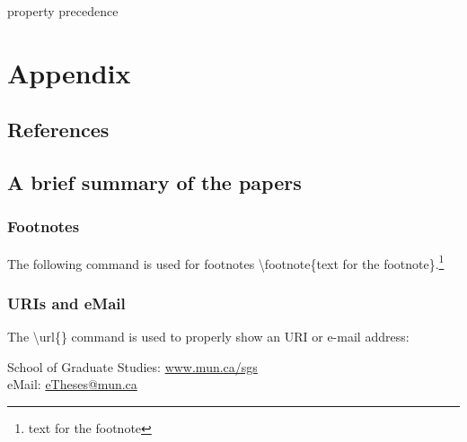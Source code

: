 \documentclass[12pt]{cls}
\begin{document}
property precedence

\chapter{Appendix}
\section{References}
\section{A brief summary of the papers}

\subsection{Footnotes}
The following command is used for footnotes \textbackslash footnote\{text for the footnote\}.\footnote{text for the footnote}

\subsection{URIs and eMail}
The \textbackslash url\{\} command is used to properly show an URI or e-mail address:

School of Graduate Studies: \url{www.mun.ca/sgs}\\
eMail: \url{eTheses@mun.ca}

\listoftables{}
\listoffigures{}

\cleardoublepage

 
\end{document}
